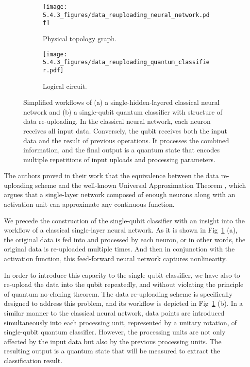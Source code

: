 \begin{figure}
	\centering
	\begin{subfigure}{0.3\textwidth}
		\centering
		\texttt{[image: 5.4.3\_figures/data\_reuploading\_neural\_network.pdf]}
		\caption{Physical topology graph.}
	\end{subfigure}
	\begin{subfigure}{0.3\textwidth}
		\centering
		\texttt{[image: 5.4.3\_figures/data\_reuploading\_quantum\_classifier.pdf]}
		\caption{Logical circuit.}
	\end{subfigure}
    \captionsetup{justification=raggedright,singlelinecheck=false}
    \caption{Simplified workflows of (a) a single-hidden-layered classical neural network and (b) a single-qubit quantum classifier with structure of data re-uploading.
    In the classical neural network, each neuron receives all input data. Conversely, the qubit receives both the input data and the result of previous operations.  It processes the combined information, and the final output is a quantum state that encodes multiple repetitions of input uploads and processing parameters.}
    \label{diagram_data_reuploading}
\end{figure}

The authors proved in their work that the equivalence between the data re-uploading scheme and the well-known Universal Approximation Theorem \cite{HORNIK1991251}, which argues that a single-layer network composed of enough neurons along with an activation unit can approximate any continuous function.



We precede the construction of the single-qubit classifier with an insight into the workflow of a classical single-layer neural network.
As it is shown in Fig~\ref{diagram_data_reuploading} (a), the  original data is fed into and processed by each neuron, or in other words, the original data is re-uploaded multiple times. And then in conjunction with the activation function, this feed-forward neural network captures nonlinearity.

In order to introduce this capacity to the single-qubit classifier, we have also to re-upload the data into the qubit repeatedly, and without violating the principle of quantum no-cloning theorem. The data re-uploading scheme \cite{PerezSalinas2020datareuploading} is specifically designed to address this problem, and its workflow is depicted in Fig~\ref{diagram_data_reuploading} (b). In a similar manner to the classical neural network, data points are introduced simultaneously into each processing unit, represented by a unitary rotation, of single-qubit quantum classifier.
However, the processing units are not only affected by the input data but also by the previous processing units.
The resulting output is a quantum state that will be measured to extract the classification result.


